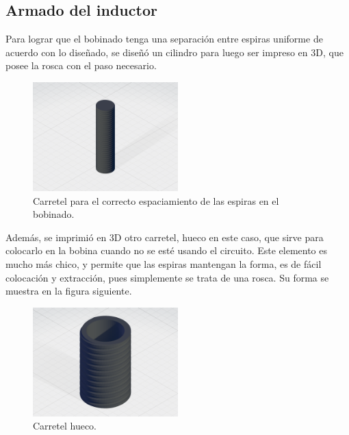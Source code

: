 \documentclass{article}
\begin{document}
\subsection{Armado del inductor}
Para lograr que el bobinado tenga una separación entre espiras uniforme de acuerdo con lo diseñado, se diseñó un cilindro para luego ser impreso en 3D, que posee la rosca con el paso necesario.
\begin{figure}[H]
\centering
\includegraphics[width=0.5\textwidth]{./img/figura19.png}
\caption{Carretel para el correcto espaciamiento de las espiras en el bobinado.}
\label{fig:circuito19}
\end{figure}
\noindent Además, se imprimió en 3D otro carretel, hueco en este caso, que sirve para colocarlo en la bobina cuando no se esté usando el circuito. Este elemento es mucho más chico, y permite que las espiras mantengan la forma, es de fácil colocación y extracción, pues simplemente se trata de una rosca. Su forma se muestra en la figura siguiente.
\begin{figure}[H]
\centering
\includegraphics[width=0.5\textwidth]{./img/figura20.png}
\caption{Carretel hueco.}
\label{fig:circuito20}
\end{figure}
\end{document}
